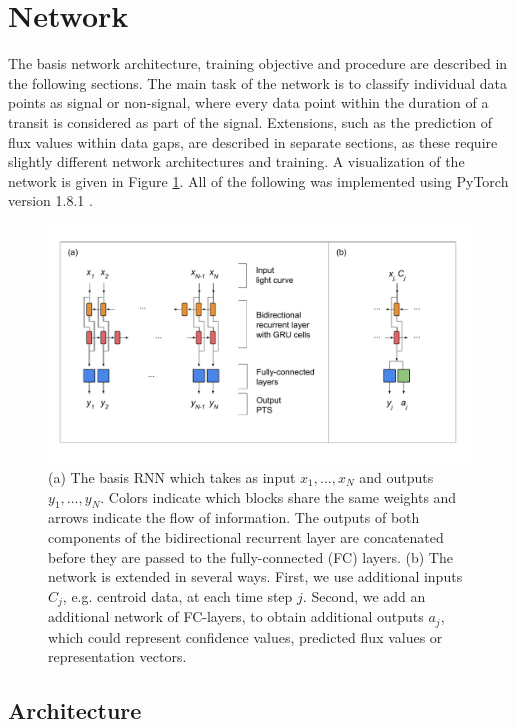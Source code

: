 
\section{Network}
\label{sec:network}

The basis network architecture, training objective and procedure are described in the following sections. The main task of the network is to classify individual data points as signal or non-signal, where every data point within the duration of a transit is considered as part of the signal. Extensions, such as the prediction of flux values within data gaps, are described in separate sections, as these require slightly different network architectures and training. A visualization of the network is given in Figure \ref{fig:network}. All of the following was implemented using PyTorch version 1.8.1 \citep{paszke2019pytorch}. 

\begin{figure}
    \centering
    \includegraphics[width=0.7\linewidth]{Methodology/Figures/network_drawing.pdf}
    \caption{(a) The basis RNN which takes as input $x_1,\dots,x_{N}$ and outputs $y_1,\dots,y_{N}$. Colors indicate which blocks share the same weights and arrows indicate the flow of information. The outputs of both components of the bidirectional recurrent layer are concatenated before they are passed to the fully-connected (FC) layers. (b) The network is extended in several ways. First, we use additional inputs $C_j$, e.g. centroid data, at each time step $j$. Second, we add an additional network of FC-layers, to obtain additional outputs $a_j$, which could represent confidence values, predicted flux values or representation vectors.}
    \label{fig:network}
\end{figure}

\subsection{Architecture}
\label{sec:architecture}


